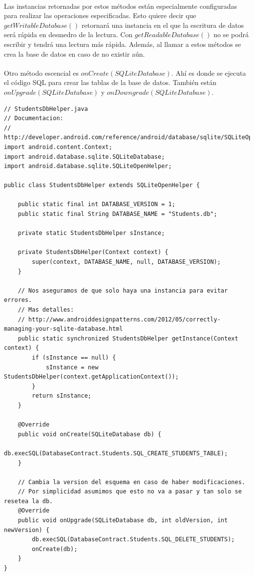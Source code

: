 \documentclass[10pt]{extarticle}
\begin{document}
\paragraph{}
Las instancias retornadas por estos métodos están especialmente configuradas para realizar las operaciones especificadas. Esto quiere decir que $getWritableDatabase()$ retornará una instancia en el que la escritura de datos será rápida en desmedro de la lectura. Con $getReadableDatabase()$ no se podrá escribir y tendrá una lectura más rápida. Además, al llamar a estos métodos se crea la base de datos en caso de no existir aún.

\paragraph{}
Otro método escencial es $onCreate(SQLiteDatabase)$. Ahí es donde se ejecuta el código SQL para crear las tablas de la base de datos. También están $onUpgrade(SQLiteDatabase)$ y $onDowngrade(SQLiteDatabase)$.

\begin{lstlisting}
// StudentsDbHelper.java
// Documentacion:
// http://developer.android.com/reference/android/database/sqlite/SQLiteOpenHelper.html
import android.content.Context;
import android.database.sqlite.SQLiteDatabase;
import android.database.sqlite.SQLiteOpenHelper;

public class StudentsDbHelper extends SQLiteOpenHelper {

    public static final int DATABASE_VERSION = 1;
    public static final String DATABASE_NAME = "Students.db";

    private static StudentsDbHelper sInstance;

    private StudentsDbHelper(Context context) {
        super(context, DATABASE_NAME, null, DATABASE_VERSION);
    }
	
	// Nos aseguramos de que solo haya una instancia para evitar errores.
	// Mas detalles: 
	// http://www.androiddesignpatterns.com/2012/05/correctly-managing-your-sqlite-database.html
    public static synchronized StudentsDbHelper getInstance(Context context) {
        if (sInstance == null) {
            sInstance = new StudentsDbHelper(context.getApplicationContext());
        }
        return sInstance;
    }
	
    @Override
    public void onCreate(SQLiteDatabase db) {
        db.execSQL(DatabaseContract.Students.SQL_CREATE_STUDENTS_TABLE);
    }
	
	// Cambia la version del esquema en caso de haber modificaciones.
	// Por simplicidad asumimos que esto no va a pasar y tan solo se resetea la db.
    @Override
    public void onUpgrade(SQLiteDatabase db, int oldVersion, int newVersion) {
        db.execSQL(DatabaseContract.Students.SQL_DELETE_STUDENTS);
        onCreate(db);
    }
}
\end{lstlisting}
\end{document}
